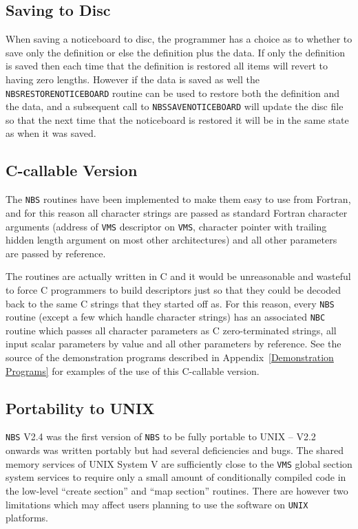 \documentclass[twoside,11pt]{article}
\renewcommand{\_}{\texttt{\symbol{95}}}
\begin{document}
      \subsection {Saving to Disc} When saving a noticeboard to disc, the
      programmer has a choice as to whether to save only the definition
      or else the definition plus the data. If only the definition is saved
      then each time that the definition is restored
      all items will revert to having zero lengths. However if the data
      is saved as well the {\tt NBS\_RESTORE\_NOTICEBOARD} routine can be used
      to restore both the definition and the data, and a subsequent call
      to {\tt NBS\_SAVE\_NOTICEBOARD} will update the disc file so that
      the next
      time that the noticeboard is restored it will be in the same state
      as when it was saved.

      \subsection {C-callable Version} The {\tt NBS} routines have been %
      implemented to make them easy to use from Fortran, and for this
      reason all character strings are passed as standard Fortran character
      arguments (address of {\tt VMS} descriptor on {\tt VMS}, character
      pointer with trailing hidden length argument on most other architectures)
      and all other parameters are passed by reference.

      The routines are actually written in C and it
      would be unreasonable and wasteful to force C programmers to build
      descriptors just so that they could be decoded back to the same C strings
      that they started off as. For this reason, every {\tt NBS} routine %
(except a few which handle character strings) has an
      associated {\tt NBC} routine which passes all character parameters %
as C
      zero-terminated strings, all input scalar parameters by value and all
      other parameters by reference. See the source of the demonstration
      programs described in Appendix~\ref {Demonstration Programs} for examples
      of the use of this C-callable version.

      \subsection {Portability to UNIX}
      {\tt NBS} V2.4 was the first version of {\tt NBS} to be fully portable
      to UNIX -- V2.2 onwards was written portably but had several
      deficiencies and bugs. The shared memory services of UNIX System V
      are sufficiently close to the {\tt VMS} global section system
      services to require only a small amount of conditionally compiled code
      in the low-level ``create section'' and ``map section'' routines.
      There are however two limitations which may affect users planning
      to use the software on {\tt UNIX} platforms.
\end{document}
